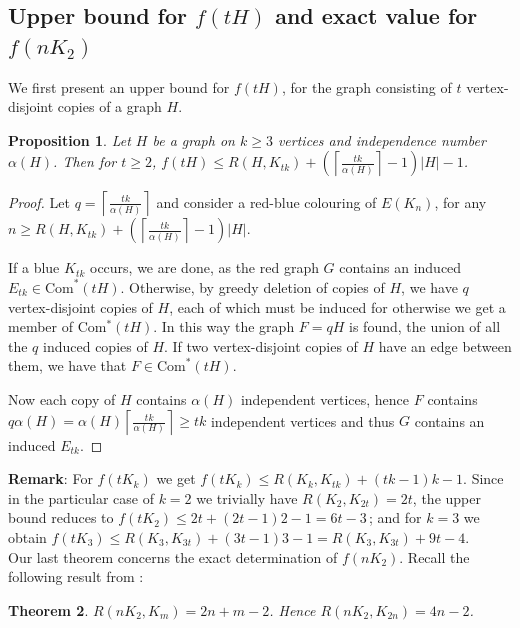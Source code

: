\documentclass[a4paper,12pt]{article}
\newtheorem{theorem}{Theorem}[section]
\newtheorem{proposition}[theorem]{Proposition}
\begin{document}
\subsection{Upper bound for $f(tH)$ and exact value for  $f(nK_2)$}

We first present an upper bound for $f(tH)$, for the graph consisting of $t$ vertex-disjoint copies  of a graph $H$.

\begin{proposition}
Let $H$ be a graph on $k \geq 3$  vertices and independence number $\alpha(H)$.  Then for $t\geq 2$, $f(tH) \leq R( H ,K_{tk}) + \left (\left \lceil \frac{tk}{\alpha(H)} \right \rceil - 1 \right )|H|  - 1$.   
\end{proposition}
\begin{proof}

Let $q = \left \lceil \frac{tk}{\alpha(H)} \right \rceil$ and consider a red-blue colouring of $E(K_n)$, for any  $n \geq R( H ,K_{tk}) + \left (\left \lceil \frac{tk}{\alpha(H)} \right \rceil - 1 \right )|H| $.   

If a blue $K_{tk}$ occurs,  we are done,  as the red graph $G$ contains an induced $E_{tk} \in \text{Com}^*(tH)$. Otherwise, by greedy deletion of copies of $H$, we have $q$ vertex-disjoint copies of $H$, each of which must be induced for otherwise we get a member of Com$^*(tH)$.  In this way  the graph   $F = qH$ is found, the union of all the $q$ induced copies of $H$.   If two vertex-disjoint copies of $H$ have an edge between them,  we have that $ F \in \text{Com}^*(tH)$.  

Now each copy of $H$ contains $\alpha(H)$ independent vertices, hence $F$ contains $q\alpha(H) =\alpha(H)\left \lceil \frac{tk}{\alpha(H)} \right \rceil \geq tk$ independent vertices and thus $G$ contains an induced $E_{tk}$.
\end{proof}
 

\noindent \textbf{Remark}: For $f(tK_k)$ we get $f(tK_k) \leq R(K_k , K_{tk}) +  (tk  - 1)k  - 1$.
Since in the particular case of $k= 2$ we trivially have $R(K_2,K_{2t})= 2t$, the upper bound reduces to $f(tK_2) \leq 2t +  (2t-1)2  - 1 = 6t - 3$\,;  and for $k=3$ we obtain $f(tK_3)  \leq R(K_3 ,K_{3t}) + (3t-1)3  - 1 = R(K_3,K_{3t}) + 9t - 4$.\\


Our last theorem concerns the exact determination of  $f(nK_2)$.  Recall the following result from \cite{LORIMER199291}:

\begin{theorem}
\label{R-match}
$R(nK_2, K_m) = 2n + m - 2$. Hence $R(nK_2, K_{2n}) = 4n-2$.
\end{theorem}
\end{document}

